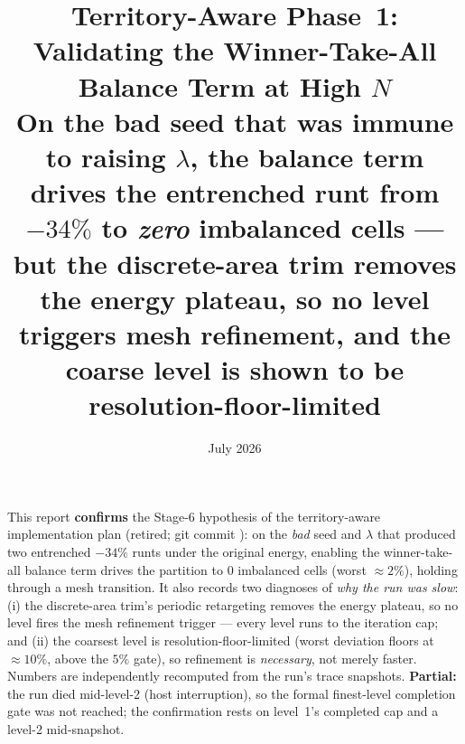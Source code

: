 \documentclass[11pt,a4paper]{article}
\title{\textbf{Territory-Aware Phase~1: Validating the Winner-Take-All Balance
  Term at High \(N\)}\\[0.5em]
  \large On the bad seed that was immune to raising \(\lambda\), the balance term
  drives the entrenched runt from \(-34\%\) to \emph{zero} imbalanced cells --- but
  the discrete-area trim removes the energy plateau, so no level triggers mesh
  refinement, and the coarse level is shown to be resolution-floor-limited}
\author{}
\date{July 2026}
\begin{document}
\maketitle

\begin{tcolorbox}[colback=green!5!white, colframe=green!55!black,
                  title={Status --- measured (partial: the finest level was
                  interrupted; confirmation is solid through level~1)},
                  fontupper=\small]
This report \textbf{confirms} the Stage-6 hypothesis of the territory-aware
implementation plan (retired; git commit ): on the
\emph{bad} seed and \(\lambda\) that produced two entrenched \(-34\%\) runts under
the original energy, enabling the winner-take-all balance term drives the partition
to \(0\) imbalanced cells (worst \(\approx 2\%\)), holding through a mesh transition.
It also records two diagnoses of \emph{why the run was slow}: (i) the discrete-area
trim's periodic retargeting removes the energy plateau, so no level fires the mesh
refinement trigger --- every level runs to the iteration cap; and (ii) the coarsest
level is resolution-floor-limited (worst deviation floors at \(\approx 10\%\), above
the \(5\%\) gate), so refinement is \emph{necessary}, not merely faster. Numbers are
independently recomputed from the run's trace snapshots. \textbf{Partial:} the run
died mid-level-2 (host interruption), so the formal finest-level completion gate was
not reached; the confirmation rests on level~1's completed cap and a level-2
mid-snapshot.
\end{tcolorbox}
\end{document}

